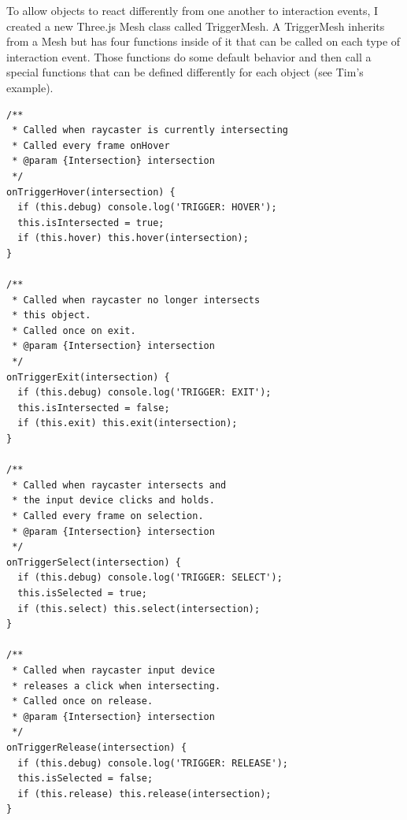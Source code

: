 \documentclass[onecolumn, draftclsnofoot,10pt, compsoc]{IEEEtran}
\begin{document}
    To allow objects to react differently from one another to interaction events, I created a new Three.js Mesh class called TriggerMesh. A TriggerMesh inherits from a Mesh but has four functions inside of it that can be called on each type of interaction event. Those functions do some default behavior and then call a special functions that can be defined differently for each object (see Tim's example).
    \begin{lstlisting}
/**
 * Called when raycaster is currently intersecting
 * Called every frame onHover
 * @param {Intersection} intersection
 */
onTriggerHover(intersection) {
  if (this.debug) console.log('TRIGGER: HOVER');
  this.isIntersected = true;
  if (this.hover) this.hover(intersection);
}

/**
 * Called when raycaster no longer intersects
 * this object.
 * Called once on exit.
 * @param {Intersection} intersection
 */
onTriggerExit(intersection) {
  if (this.debug) console.log('TRIGGER: EXIT');
  this.isIntersected = false;
  if (this.exit) this.exit(intersection);
}

/**
 * Called when raycaster intersects and
 * the input device clicks and holds.
 * Called every frame on selection.
 * @param {Intersection} intersection
 */
onTriggerSelect(intersection) {
  if (this.debug) console.log('TRIGGER: SELECT');
  this.isSelected = true;
  if (this.select) this.select(intersection);
}

/**
 * Called when raycaster input device
 * releases a click when intersecting.
 * Called once on release.
 * @param {Intersection} intersection
 */
onTriggerRelease(intersection) {
  if (this.debug) console.log('TRIGGER: RELEASE');
  this.isSelected = false;
  if (this.release) this.release(intersection);
}
    \end{lstlisting}
    
\end{document}
